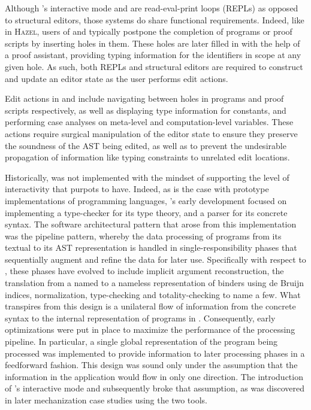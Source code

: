 Although \Beluga's interactive mode and \Harpoon are read-eval-print loops (REPLs) as opposed to structural editors, those systems do share functional requirements.
Indeed, like in \textsc{Hazel}, users of \Beluga and \Harpoon typically postpone the completion of programs or proof scripts by inserting holes in them.
These holes are later filled in with the help of a proof assistant, providing typing information for the identifiers in scope at any given hole.
As such, both REPLs and structural editors are required to construct and update an editor state as the user performs edit actions.

Edit actions in \Beluga and \Harpoon include navigating between holes in programs and proof scripts respectively, as well as displaying type information for constants, and performing case analyses on meta-level and computation-level variables.
These actions require surgical manipulation of the editor state to ensure they preserve the soundness of the AST being edited, as well as to prevent the undesirable propagation of information like typing constraints to unrelated edit locations.

Historically, \Beluga was not implemented with the mindset of supporting the level of interactivity that \Harpoon purpots to have.
Indeed, as is the case with prototype implementations of programming languages, \Beluga's early development focused on implementing a type-checker for its type theory, and a parser for its concrete syntax.
The software architectural pattern that arose from this implementation was the pipeline pattern, whereby the data processing of programs from its textual to its AST representation is handled in single-responsibility phases that sequentially augment and refine the data for later use.
Specifically with respect to \Beluga, these phases have evolved to include implicit argument reconstruction, the translation from a named to a nameless representation of binders using de Bruijn indices, normalization, type-checking and totality-checking to name a few.
What transpires from this design is a unilateral flow of information from the concrete syntax to the internal representation of programs in \Beluga.
Consequently, early optimizations were put in place to maximize the performance of the processing pipeline.
In particular, a single global representation of the \Beluga program being processed was implemented to provide information to later processing phases in a feedforward fashion.
This design was sound only under the assumption that the information in the application would flow in only one direction.
The introduction of \Beluga's interactive mode and subsequently \Harpoon broke that assumption, as was discovered in later mechanization case studies using the two tools.

